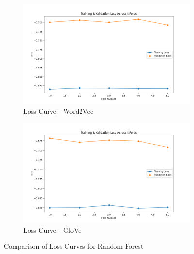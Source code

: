\begin{figure}[H]
    \begin{subfigure}[b]{0.48\textwidth}
        \includegraphics[width=\textwidth]{img/report_info/img/1.4.RF/best_random_forest_word2vec_loss.png}
        \caption{Loss Curve - Word2Vec}
        \label{fig:rf-word2vec-loss}
    \end{subfigure}
    \begin{subfigure}[b]{0.48\textwidth}
        \includegraphics[width=\textwidth]{img/report_info/img/1.4.RF/best_random_forest_glove_loss.png}
        \caption{Loss Curve - GloVe}
        \label{fig:rf-glove-loss}
    \end{subfigure}
    
    \caption{Comparison of Loss Curves for Random Forest}
    \label{fig:rf-loss-group}
\end{figure}

